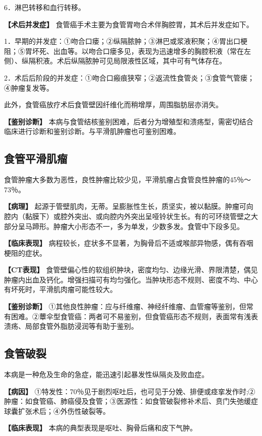 6．淋巴转移和血行转移。

\textbf{【术后并发症】}
食管癌手术主要为食管胃吻合术伴胸腔胃，其术后并发症如下。

1．早期的并发症：①吻合口瘘；②纵隔脓肿；③淋巴或浆液积聚；④胃出口梗阻；⑤胃坏死、出血等。以吻合口瘘多见，表现为迅速增多的胸腔积液（常在左侧）、纵隔积液。术后纵隔脓肿可见局限液性区域，其中可有气体存在。

2．术后后阶段的并发症：①吻合口瘢痕狭窄；②返流性食管炎；③食管气管瘘；④肿瘤复发等。

此外，食管癌放疗术后食管壁因纤维化而稍增厚，周围脂肪层亦消失。

\textbf{【鉴别诊断】}
本病与食管结核鉴别困难，后者分为增殖型和溃疡型，需密切结合临床进行诊断和鉴别诊断。与平滑肌肿瘤也可鉴别困难。

\subsection{食管平滑肌瘤}

食管肿瘤大多数为恶性，良性肿瘤比较少见，平滑肌瘤占食管良性肿瘤的45％～73％。

\textbf{【病理】}
起源于管壁肌肉，无蒂。呈膨胀性生长，质坚实，被以黏膜。肿瘤可向腔内（黏膜下）或腔外突出、或向腔内外突出呈哑铃状生长。有的可环绕管壁之大部分呈马蹄形。肿瘤大小形态不一，多为单发，少数多发。食管中下段多见。

\textbf{【临床表现】}
病程较长，症状多不显著，为胸骨后不适或喉部异物感，偶有吞咽梗阻的症状。

\textbf{【CT表现】}
食管壁偏心性的软组织肿块，密度均匀、边缘光滑、界限清楚，偶见肿瘤内出血及钙化。增强扫描可有均匀强化。当肿块形态不规则、密度不均、中心有坏死时，平滑肌肉瘤可能性较大。

\textbf{【鉴别诊断】}
①其他良性肿瘤：应与纤维瘤、神经纤维瘤、血管瘤等鉴别，但常有困难。②蕈伞型食管癌：两者可不易鉴别，但食管癌形态不规则，表面常有浅表溃疡、局部食管外脂肪浸润等有助于鉴别。

\subsection{食管破裂}

本病是一种危及生命的急症，能迅速引起暴发性纵隔炎及败血症。

\textbf{【病因】}
①特发性：70％见于剧烈呕吐后，也可见于分娩、排便或痉挛发作时;②肿瘤：如食管癌、肺癌侵及食管；③医源性：如食管破裂修补术后、贲门失弛缓症球囊扩张术后；④外伤性破裂等。

\textbf{【临床表现】} 本病的典型表现是呕吐、胸骨后痛和皮下气肿。

